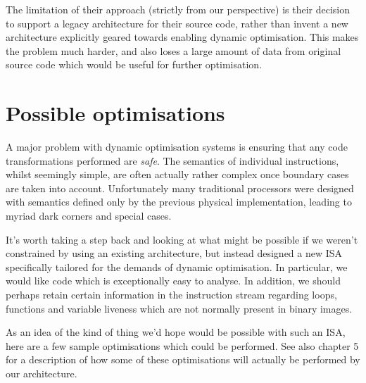 The limitation of their approach (strictly from our perspective) is their decision to support a legacy architecture for their source code, rather than invent a new architecture explicitly geared towards enabling dynamic optimisation. This makes the problem much harder, and also loses a large amount of data from original source code which would be useful for further optimisation.

\section{Possible optimisations}

A major problem with dynamic optimisation systems is ensuring that any code transformations performed are \emph{safe}. The semantics of individual instructions, whilst seemingly simple, are often actually rather complex once boundary cases are taken into account. Unfortunately many traditional processors were designed with semantics defined only by the previous physical implementation, leading to myriad dark corners and special cases.

It's worth taking a step back and looking at what might be possible
if we weren't constrained by using an existing architecture, but
instead designed a new ISA specifically tailored for the demands of
dynamic optimisation. In particular, we would like code which is exceptionally
easy to analyse. In addition, we should perhaps retain certain information
in the instruction stream regarding loops, functions and variable
liveness which are not normally present in binary images.

As an idea of the kind of thing we'd hope would be possible with such
an ISA, here are a few sample optimisations which could be performed. See also chapter 5 for a description of how some of these optimisations will actually be performed by our architecture.

